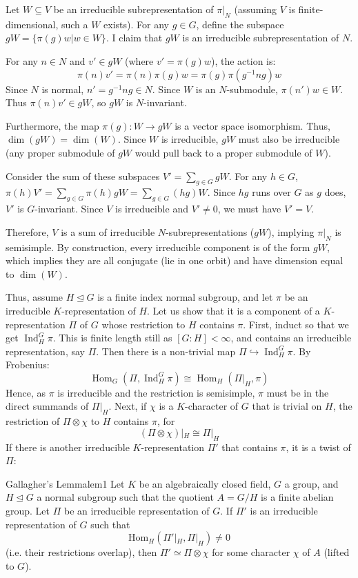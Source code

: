 \documentclass{article}
\newcommand{\Hom}{{\operatorname{Hom}}}
\newcommand{\Ind}{{\operatorname{Ind}}}
\newcommand{\nsubg}{\trianglelefteq}
\renewcommand{\mid}{\big|}
\begin{document}
\begin{Proof}
	Let $W \subseteq V$ be an irreducible subrepresentation of $\pi|_N$ (assuming $V$ is finite-dimensional, such a $W$ exists).
	For any $g \in G$, define the subspace $gW = \{ \pi(g)w \mid w \in W \}$. I claim that $gW$ is an irreducible
	subrepresentation of $N$.

	For any $n \in N$ and $v' \in gW$ (where $v' = \pi(g)w$), the action is:
	\[ \pi(n)v' = \pi(n)\pi(g)w = \pi(g) \pi(g^{-1}ng) w \]
	Since $N$ is normal, $n' = g^{-1}ng \in N$. Since $W$ is an $N$-submodule, $\pi(n')w \in W$.
	Thus $\pi(n)v' \in gW$, so $gW$ is $N$-invariant.

	Furthermore, the map $\pi(g): W \to gW$ is a vector space isomorphism. Thus, $\dim(gW) = \dim(W)$.
	Since $W$ is irreducible, $gW$ must also be irreducible (any proper submodule of $gW$ would pull back to a proper submodule of $W$).

	Consider the sum of these subspaces $V' = \sum_{g \in G} gW$.
	For any $h \in G$, $\pi(h)V' = \sum_{g \in G} \pi(h)gW = \sum_{g \in G} (hg)W$.
	Since $hg$ runs over $G$ as $g$ does, $V'$ is $G$-invariant.
	Since $V$ is irreducible and $V' \neq 0$, we must have $V' = V$.

	Therefore, $V$ is a sum of irreducible $N$-subrepresentations ($gW$), implying $\pi|_N$ is semisimple.
	By construction, every irreducible component is of the form $gW$, which implies they are all conjugate
	(lie in one orbit) and have dimension equal to $\dim(W)$.
\end{Proof}

Thus, assume $H\nsubg G$ is a finite index normal subgroup, and let $\pi$ be an irreducible $K$-representation
of $H$. Let us show that it is a component of a $K$-representation $\Pi$ of $G$ whose restriction to $H$
contains $\pi$. First, induct so that we get $\Ind_H^G\pi$. This is finite length still as $[G:H] < \infty$,
and contains an irreducible representation, say $\Pi$. Then there is a non-trivial map $\Pi \hookrightarrow \Ind_H^G
\pi$. By Frobenius:
\[
  \Hom_G(\Pi, \Ind_H^G \pi) \cong \Hom_H(\Pi|_H, \pi)
\]
Hence, as $\pi$ is irreducible and the restriction is semisimple, $\pi$ must be in the direct summands of
$\Pi|_H$. Next, if $\chi$ is a $K$-character of $G$ that is trivial on $H$, the restriction of $\Pi\otimes
\chi$ to $H$ contains $\pi$, for
\[
  (\Pi \otimes \chi)|_H \cong \Pi|_H
\]
If there is another irreducible $K$-representation $\Pi'$ that contains $\pi$, it is a twist of $\Pi$:

\begin{lem}{Gallagher's Lemma}{lem1}
    Let $K$ be an algebraically closed field, $G$ a group, and $H \trianglelefteq G$ a normal subgroup such that the quotient $A = G/H$ is a finite abelian group.
    Let $\Pi$ be an irreducible representation of $G$. If $\Pi'$ is an irreducible representation of $G$ such that
    \[ \mathrm{Hom}_H(\Pi'|_H, \Pi|_H) \neq 0 \]
    (i.e. their restrictions overlap), then $\Pi' \simeq \Pi \otimes \chi$ for some character $\chi$ of $A$ (lifted to $G$).
\end{lem}
\end{document}
